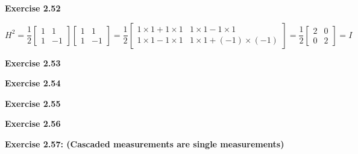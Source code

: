 \documentclass{article}
\begin{document}
\begin{framed}
    \noindent \textbf{Exercise 2.52}
    
    \medskip

    $$
    H^2 = \frac{1}{2}\begin{bmatrix}1 & 1\\ 1 & -1\end{bmatrix}\begin{bmatrix}1 & 1\\ 1 & -1\end{bmatrix} = \frac{1}{2}\begin{bmatrix} 1\times1 + 1\times1 & 1\times1 - 1\times1 \\ 1 \times 1 - 1 \times 1 & 1 \times 1 + (-1)\times(-1)\end{bmatrix} = \frac{1}{2}\begin{bmatrix}2 & 0 \\ 0 & 2\end{bmatrix} = I
    $$
    
\end{framed}

\bigskip

\begin{framed}
    \noindent \textbf{Exercise 2.53}
    
    \medskip
    
    
\end{framed}

\bigskip

\begin{framed}
    \noindent \textbf{Exercise 2.54}
    
    \medskip
    
    
\end{framed}

\bigskip

\begin{framed}
    \noindent \textbf{Exercise 2.55}
    
    \medskip
    
    
\end{framed}

\bigskip

\begin{framed}
    \noindent \textbf{Exercise 2.56}
    
    \medskip
    
    
\end{framed}

\bigskip

\begin{framed}
    \noindent \textbf{Exercise 2.57: (Cascaded measurements are single measurements)}
    
    \medskip
    
    
\end{framed}
\end{document}
